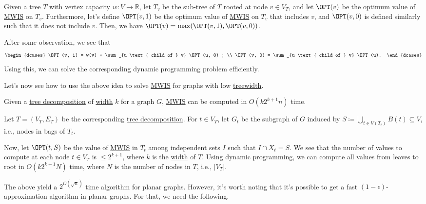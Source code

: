 \begin{eg}
	Given a tree \(T\) with vertex capacity \(w\colon V \to \mathbb{R} \), let \(T_v\) be the sub-tree of \(T\) rooted at node \(v \in V_T\), and let \(\OPT(v)\) be the optimum value of \hyperref[prb:MWIS]{MWIS} on \(T_v\). Furthermore, let's define \(\OPT(v, 1)\) be the optimum value of \hyperref[prb:MWIS]{MWIS} on \(T_v\) that includes \(v\), and \(\OPT(v, 0)\) is defined similarly such that it does not include \(v\). Then, we have \(\OPT(v) = \max (\OPT(v, 1), \OPT(v, 0))\).

	After some observation, we see that
	\[
		\begin{dcases}
			\OPT(v, 1) = w(v) + \sum_{u \text{ child of } v} \OPT(u, 0) ; \\
			\OPT(v, 0) = \sum_{u \text{ child of } v} \OPT(u).
		\end{dcases}
	\]
	Using this, we can solve the corresponding dynamic programming problem efficiently.
\end{eg}

Let's now see how to use the above idea to solve \hyperref[prb:MWIS]{MWIS} for graphs with low \hyperref[def:treewidth]{treewidth}.

\begin{eg}\label{eg:MWIS-tree-decomposition}
	Given a \hyperref[def:tree-decomposition]{tree decomposition} of \hyperref[def:tree-decomposition-width]{width} \(k\) for a graph \(G\), \hyperref[prb:MWIS]{MWIS} can be computed in \(O(k 2^{k+1} n)\) time.
\end{eg}
\begin{explanation}
	Let \(T = (V_T, E_T)\) be the corresponding \hyperref[def:tree-decomposition]{tree decomposition}. For \(t \in V_T\), let \(G_t\) be the subgraph of \(G\) induced by \(S \coloneqq \bigcup_{t \in V(T_t)} B(t) \subseteq V\), i.e., nodes in bags of \(T_t\).

	Now, let \(\OPT(t, S)\) be the value of \hyperref[prb:MWIS]{MWIS} in \(T_t\) among independent sets \(I\) such that \(I \cap X_t = S\). We see that the number of values to compute at each node \(t \in V_T\) is \(\leq 2^{k+1}\), where \(k\) is the \hyperref[def:tree-decomposition-width]{width} of \(T\). Using dynamic programming, we can compute all values from leaves to root in \(O(k 2^{k+1} N)\) time, where \(N\) is the number of nodes in \(T\), i.e., \(\lvert V_T \rvert \).
\end{explanation}

The above yield a \(2^{O(\sqrt{n} )}\) time algorithm for planar graphs. However, it's worth noting that it's possible to get a fast \((1 - \epsilon )\)-approximation algorithm in planar graphs. For that, we need the following.

